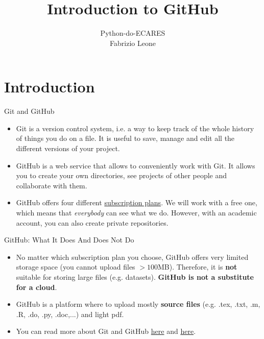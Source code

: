 \documentclass[aspectratio=169]{beamer}
\title{Introduction to GitHub}
\author{Python-do-ECARES \\ Fabrizio Leone}
\date{}
\begin{document}
\begin{frame}[plain]
    \maketitle
\end{frame}

\section{Introduction}

\begin{frame}{Git and GitHub}

\begin{itemize}\setlength\itemsep{2.5em}
	\item Git is a version control system, i.e. a way to keep track of the whole history of things you do on a file. It is useful to save, manage and edit all the different versions of your project. 
	\item GitHub is a web service that allows to conveniently work with Git. It allows you to create your own directories, see projects of other people and collaborate with them. 
	\item GitHub offers four different \href{https://github.com/pricing}{subscription plans}. We will work with a free one, which means that \emph{everybody} can see what we do. However, with an academic account, you can also create private repositories.
\end{itemize}

\end{frame}

\begin{frame}{GitHub: What It Does And Does Not Do}
\begin{itemize}\setlength\itemsep{2.0em}
	\item No matter which subscription plan you choose, GitHub offers very limited storage space (you cannot upload files $>100$MB). Therefore, it is \textbf{not} suitable for storing large files (e.g. datasets). \textbf{GitHub is not a substitute for a cloud}.  
	\item GitHub is a platform where to upload mostly \textbf{source files} (e.g. .tex, .txt, .m, .R, .do, .py, .doc,...) and light pdf.
	\item You can read more about Git and GitHub \href{https://medium.com/@abhishekj/an-intro-to-git-and-github-1a0e2c7e3a2f}{here} and \href{https://medium.com/launch-school/understanding-git-and-github-8ac987877a5}{here}.
\end{itemize}

\end{frame}
\end{document}

